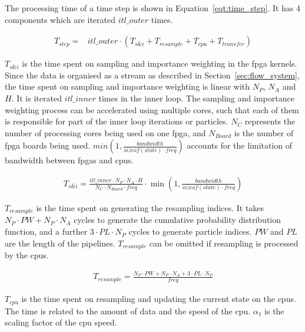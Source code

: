 The processing time of a time step is shown in Equation~\ref{eqt:time_step}.
It has 4 components which are iterated $itl\_outer$ times.

\begin{equation}
\begin{aligned}
T_{step} = & itl\_outer \cdot \left (T_{s\&i} + T_{resample} + T_{cpu} + T_{transfer} \right)
\end{aligned}
\label{eqt:time_step}
\end{equation}
 
$T_{s\&i}$ is the time spent on sampling and importance weighting in the \gls{fpga} kernels.
Since the data is organised as a stream as described in Section~\ref{sec:flow_system}, the time spent on sampling and importance weighting is linear with $N_P$, $N_A$ and $H$.
It is iterated $itl\_inner$ times in the inner loop.
The sampling and importance weighting process can be accelerated using multiple cores, such that each of them is responsible for part of the inner loop iterations or particles.
$N_C$ represents the number of processing cores being used on one \gls{fpga}, and $N_{Board}$ is the number of \gls{fpga} boards being used.
$min(1,\frac{bandwidth}{sizeof(state) \cdot freq})$ accounts for the limitation of bandwidth between \glspl{fpga} and \glspl{cpu}.

\begin{equation}
\begin{aligned}
T_{s\&i} = \frac{itl\_inner \cdot N_P \cdot N_A \cdot H}{N_C \cdot N_{Board} \cdot freq} \cdot \min\left(1,\frac{bandwidth}{sizeof(state) \cdot freq}\right)
\end{aligned}
\end{equation}

$T_{resample}$ is the time spent on generating the resampling indices.
It takes $N_P \cdot PW + N_P \cdot N_A$ cycles to generate the cumulative probability distribution function, and a further $3 \cdot PL \cdot N_P$ cycles to generate particle indices.
$PW$ and $PL$ are the length of the pipelines.
$T_{resample}$ can be omitted if resampling is processed by the \glspl{cpu}.

\begin{equation}
\begin{aligned}
T_{resample} = \frac{N_P \cdot PW + N_P \cdot N_A + 3 \cdot PL \cdot N_P}{freq}
\end{aligned}
\end{equation}

$T_{cpu}$ is the time spent on resampling and updating the current state on the \glspl{cpu}.
The time is related to the amount of data and the speed of the \gls{cpu}.
$\alpha_1$ is the scaling factor of the \gls{cpu} speed.


